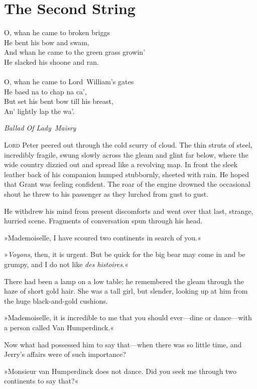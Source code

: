 
\chapter{The Second String}

\epigraph{
O, whan he came to broken briggs\\
He bent his bow and swam,\\
And whan he came to the green grass growin'\\
He slacked his shoone and ran.\\
~\\
O, whan he came to Lord~William's gates\\
He baed na to chap na ca',\\
But set his bent bow till his breast,\\
An' lightly lap the wa'.}{\textit{Ballad Of Lady~Maisry}}


\lettrine[lines=4]{L}{ord} Peter peered out through the cold scurry of cloud. The thin
struts of steel, incredibly fragile, swung slowly across the gleam
and glint far below, where the wide country dizzied out and spread
like a revolving map. In front the sleek leather back of his companion
humped stubbornly, sheeted with rain. He hoped that Grant was feeling
confident. The roar of the engine drowned the occasional shout he threw
to his passenger as they lurched from gust to gust.

He withdrew his mind from present discomforts and went over that last,
strange, hurried scene. Fragments of conversation spun through his head.

»Mademoiselle, I have scoured two continents in search of you.«

»\textit{Voyons}, then, it is urgent. But be quick for the big bear may come
in and be grumpy, and I do not like \textit{des histoires}.«

There had been a lamp on a low table; he remembered the gleam through
the haze of short gold hair. She was a tall girl, but slender, looking
up at him from the huge black-and-gold cushions.

»Mademoiselle, it is incredible to me that you should ever—dine or
dance—with a person called Van Humperdinck.«

Now what had possessed him to say that—when there was so little time,
and Jerry's affairs were of such importance?

»Monsieur van Humperdinck does not dance. Did you seek me through two
continents to say that?«

